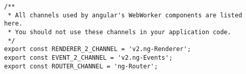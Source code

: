 \begin{verbatim}
/**
 * All channels used by angular's WebWorker components are listed here.
 * You should not use these channels in your application code.
 */
export const RENDERER_2_CHANNEL = 'v2.ng-Renderer';
export const EVENT_2_CHANNEL = 'v2.ng-Events';
export const ROUTER_CHANNEL = 'ng-Router';
\end{verbatim}
